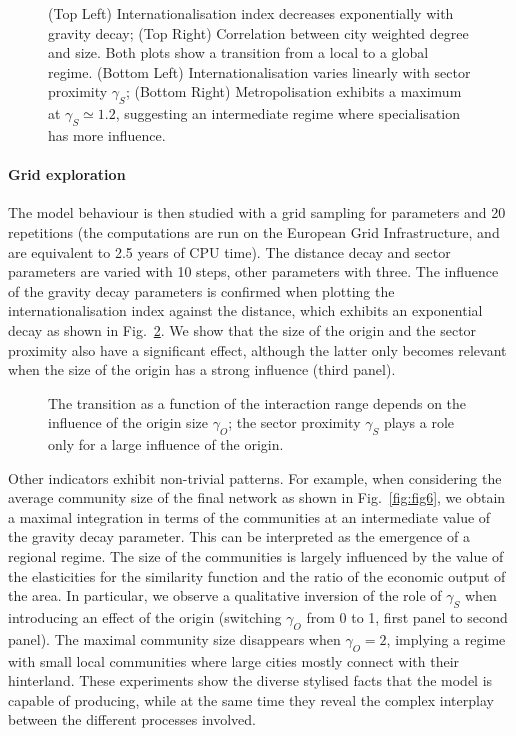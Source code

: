 \documentclass[10pt,letterpaper]{article}
\begin{document}
\begin{figure}
	\begin{center}
	\end{center}
    \caption{(Top Left) Internationalisation index decreases exponentially with gravity decay; (Top Right) Correlation between city weighted degree and size. Both plots show a transition from a local to a global regime. (Bottom Left) Internationalisation varies linearly with sector proximity $\gamma_S$; (Bottom Right) Metropolisation exhibits a maximum at $\gamma_S \simeq 1.2$, suggesting an intermediate regime where specialisation has more influence. \label{fig:fig4}}
\end{figure}



\paragraph{Grid exploration}

The model behaviour is then studied with a grid sampling for parameters and 20 repetitions (the computations are run on the European Grid Infrastructure, and are equivalent to 2.5 years of CPU time). The distance decay and sector parameters are varied with 10 steps, other parameters with three. The influence of the gravity decay parameters is confirmed when plotting the internationalisation index against the distance, which exhibits an exponential decay as shown in Fig.~\ref{fig:fig5}. We show that the size of the origin and the sector proximity also have a significant effect, although the latter only becomes relevant when the size of the origin has a strong influence (third panel).


\begin{figure}
    \caption{The transition as a function of the interaction range depends on the influence of the origin size $\gamma_O$; the sector proximity $\gamma_S$ plays a role only for a large influence of the origin.\label{fig:fig5}}
\end{figure}

Other indicators exhibit non-trivial patterns. For example, when considering the average community size of the final network as shown in Fig.~\ref{fig:fig6}, we obtain a maximal integration in terms of the communities at an intermediate value of the gravity decay parameter. This can be interpreted as the emergence of a regional regime. The size of the communities is largely influenced by the value of the elasticities for the similarity function and the ratio of the economic output of the area. In particular, we observe a qualitative inversion of the role of $\gamma_S$ when introducing an effect of the origin (switching $\gamma_O$ from 0 to 1, first panel to second panel). The maximal community size disappears when $\gamma_O = 2$, implying a regime with small local communities where large cities mostly connect with their hinterland. These experiments show the diverse stylised facts that the model is capable of producing, while at the same time they reveal the complex interplay between the different processes involved.
\end{document}
